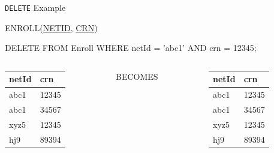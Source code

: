 \documentclass[aspectratio=169]{beamer}
\begin{document}
\begin{frame}[fragile]{\texttt{DELETE} Example}

ENROLL(\underline{NETID}, \underline{CRN})\\
\begin{SQL}
DELETE FROM Enroll
WHERE netId = 'abc1' AND crn = 12345;
\end{SQL}
\vspace{2em}
\begin{columns}[T]
\begin{column}{0.3\textwidth}
\begin{tabular}{|l|l|} \hline
\textbf{netId} & \textbf{crn} \\ \hline
abc1 & 12345 \\ \hline
abc1 & 34567 \\ \hline
xyz5 & 12345 \\ \hline
hj9 & 89394 \\ \hline
\end{tabular}
\end{column}
\begin{column}{0.3\textwidth}
BECOMES
\end{column}
\begin{column}{0.3\textwidth}
\begin{tabular}{|l|l|} \hline
\textbf{netId} & \textbf{crn} \\ \hline
\rowcolor{black}abc1 & 12345 \\ \hline
abc1 & 34567 \\ \hline
xyz5 & 12345 \\ \hline
hj9 & 89394 \\ \hline
\end{tabular}
\end{column}
\end{columns}

\end{frame}
\end{document}
